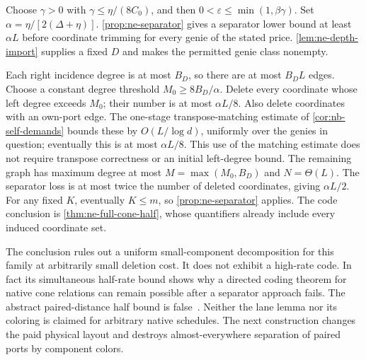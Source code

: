 \begin{informalproof}
Choose $\gamma>0$ with $\gamma\le\eta/(8C_0)$, and then
$0<\varepsilon\le\min(1,\beta\gamma)$.  Set
$\alpha=\eta/[2(\Delta+\eta)]$.  \cref{prop:ne-separator}
gives a separator lower bound at least $\alpha L$ before coordinate
trimming for every genie of the stated price.  \cref{lem:ne-depth-import}
supplies a fixed $D$ and makes the permitted genie class nonempty.

Each right incidence degree is at most $B_D$, so there are at most
$B_D L$ edges.  Choose a constant degree threshold $M_0\ge8B_D/\alpha$.
Delete every coordinate whose left degree exceeds $M_0$; their number is
at most $\alpha L/8$.  Also delete coordinates with an own-port edge.
The one-stage transpose-matching estimate of \cref{cor:nb-self-demands}
bounds these by $O(L/\log d)$, uniformly over the genies in question;
eventually this is at most $\alpha L/8$.  This use of the matching estimate
does not require transpose correctness or an initial left-degree bound.
The remaining graph has maximum degree at most $M=\max(M_0,B_D)$ and
$N=\Theta(L)$.  The separator loss is at most twice the number of deleted
coordinates, giving $\alpha L/2$.  For any fixed $K$, eventually $K\le m$,
so \cref{prop:ne-separator} applies.  The code conclusion is
\cref{thm:ne-full-cone-half}, whose quantifiers already include every
induced coordinate set.
\end{informalproof}

\begin{remark}\label{rem:ne-scope}
The conclusion rules out a uniform small-component decomposition for this
family at arbitrarily small deletion cost.  It does not exhibit a high-rate
code.  In fact its simultaneous half-rate bound shows why a directed
coding theorem for native cone relations can remain possible after a
separator approach fails. The abstract paired-distance half bound is
false~\cite{StorageCodes2026}.
Neither the lane lemma nor its coloring is claimed for arbitrary native
schedules.  The next construction changes the paid physical layout and
destroys almost-everywhere separation of paired ports by component colors.
\end{remark}
